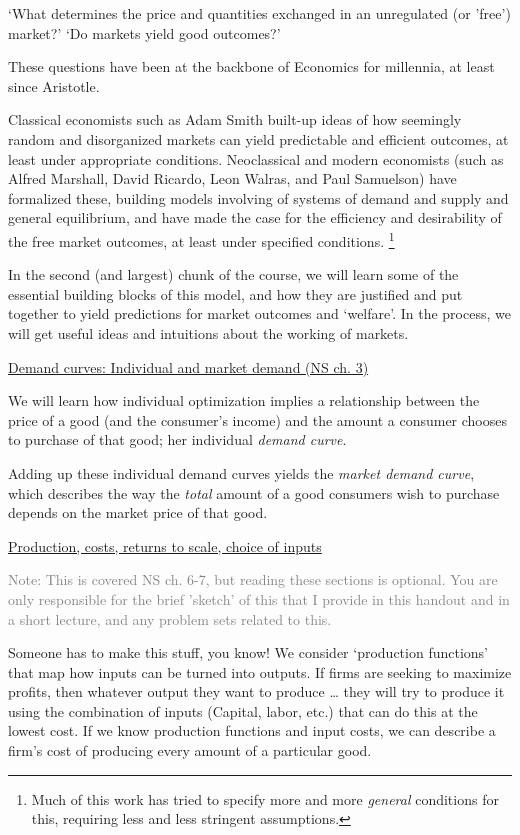 \documentclass[]{article}
\begin{document}
`What determines the price and quantities exchanged in an unregulated
(or 'free') market?' `Do markets yield good outcomes?'

These questions have been at the backbone of Economics for millennia, at
least since Aristotle.

Classical economists such as Adam Smith built-up ideas of how seemingly
random and disorganized markets can yield predictable and efficient
outcomes, at least under appropriate conditions. Neoclassical and modern
economists (such as Alfred Marshall, David Ricardo, Leon Walras, and
Paul Samuelson) have formalized these, building models involving of
systems of demand and supply and general equilibrium, and have made the
case for the efficiency and desirability of the free market outcomes, at
least under specified conditions. \footnote{Much of this work has tried
  to specify more and more \emph{general} conditions for this, requiring
  less and less stringent assumptions.}

In the second (and largest) chunk of the course, we will learn some of
the essential building blocks of this model, and how they are justified
and put together to yield predictions for market outcomes and `welfare'.
In the process, we will get useful ideas and intuitions about the
working of markets.

\underline{Demand curves: Individual and market demand (NS ch. 3)}

We will learn how individual optimization implies a relationship between
the price of a good (and the consumer's income) and the amount a
consumer chooses to purchase of that good; her individual \emph{demand
curve}.

Adding up these individual demand curves yields the \emph{market demand
curve}, which describes the way the \emph{total} amount of a good
consumers wish to purchase depends on the market price of that good.

\underline{Production, costs, returns to scale, choice of inputs}

\textcolor{gray}{Note: This is covered NS ch. 6-7, but reading these sections is optional. You are only responsible for the brief 'sketch' of this that I provide in this handout and in a short lecture, and any problem sets related to this.}

Someone has to make this stuff, you know! We consider `production
functions' that map how inputs can be turned into outputs. If firms are
seeking to maximize profits, then whatever output they want to produce
\ldots{} they will try to produce it using the combination of inputs
(Capital, labor, etc.) that can do this at the lowest cost. If we know
production functions and input costs, we can describe a firm's cost of
producing every amount of a particular good.
\end{document}
